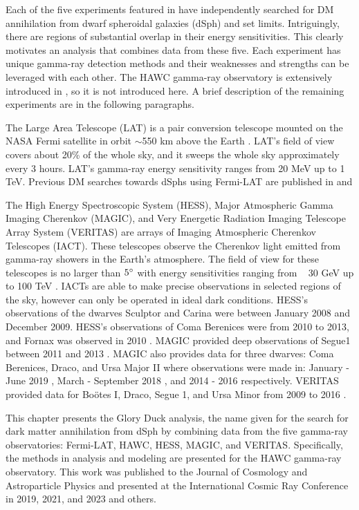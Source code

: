 Each of the five experiments featured in  have independently searched for DM annihilation from dwarf spheroidal galaxies (dSph) and set limits.
Intriguingly, there are regions of substantial overlap in their energy sensitivities.
This clearly motivates an analysis that combines data from these five.
Each experiment has unique gamma-ray detection methods and their weaknesses and strengths can be leveraged with each other.
The HAWC gamma-ray observatory is extensively introduced in , so it is not introduced here.
A brief description of the remaining experiments are in the following paragraphs.

The Large Area Telescope (LAT) is a pair conversion telescope mounted on the NASA Fermi satellite in orbit $\sim$550 km above the Earth \cite{FermiLAT}.
LAT's field of view covers about 20\% of the whole sky, and it sweeps the whole sky approximately every 3 hours.
LAT's gamma-ray energy sensitivity ranges from 20 MeV up to 1 TeV.
Previous DM searches towards dSphs using Fermi-LAT are published in \cite{FermiLAT:dm1} and \cite{FermiLAT:dm2}

\sloppy The High Energy Spectroscopic System (HESS), Major Atmospheric Gamma Imaging
Cherenkov (MAGIC), and Very Energetic Radiation Imaging Telescope Array System (VERITAS) are arrays of Imaging Atmospheric Cherenkov Telescopes (IACT).
These telescopes observe the Cherenkov light emitted from gamma-ray showers in the Earth's atmosphere.
The field of view for these telescopes is no larger than $5\degree$ with energy sensitivities ranging from ~ 30 GeV up to 100 TeV \cite{HESS,MAGIC,VERITAS}.
IACTs are able to make precise observations in selected regions of the sky, however can only be operated in ideal dark conditions.
HESS's  observations of the dwarves Sculptor and Carina were between January 2008 and December 2009.
HESS's observations of Coma Berenices were from 2010 to 2013, and Fornax was observed in 2010 \cite{HESS:dm_sculptor_carina,HESS:dm_dwarves,HESS:dm_gamma_lines}.
MAGIC provided deep observations of Segue1 between 2011 and 2013 \cite{MAGIC:dm_segue1}.
MAGIC also provides data for three dwarves: Coma Berenices, Draco, and Ursa Major II where observations were made in: January - June 2019 \cite{MAGIC:dm_comab_draco}, March - September 2018 \cite{MAGIC:dm_comab_draco}, and 2014 - 2016 \cite{MAGIC:dm_uma2} respectively.
VERITAS provided data for Boötes I, Draco, Segue 1, and Ursa Minor from 2009 to 2016 \cite{VERITAS:dm_dwarves}.

This chapter presents the Glory Duck analysis, the name given for the search for dark matter annihilation from dSph by combining data from the five gamma-ray observatories: Fermi-LAT, HAWC, HESS, MAGIC, and VERITAS.
Specifically, the methods in analysis and modeling are presented for the HAWC gamma-ray observatory.
This work was published to the Journal of Cosmology and Astroparticle Physics and presented at the International Cosmic Ray Conference in 2019, 2021, and 2023 \cite{glory_duck:ICRC2019,glory_duck:ICRC2021,glory_duck:ICRC2023} and others.

